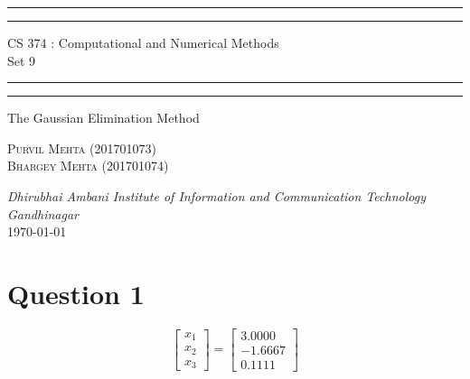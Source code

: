 \documentclass{article}
\begin{document}
\begin{titlepage}
	\centering 
	\scshape
	\vspace*{\baselineskip}
	\rule{\textwidth}{1.6pt}\vspace*{-\baselineskip}\vspace*{2pt}
	\rule{\textwidth}{0.4pt} 
	\vspace{0.75\baselineskip}
	
	{\Large CS 374 : Computational and Numerical Methods \\\vspace{0.75\baselineskip} Set 9}
	\vspace{0.75\baselineskip}
	
	\rule{\textwidth}{0.4pt}\vspace*{-\baselineskip}\vspace{3.2pt} 
	\rule{\textwidth}{1.6pt}
	
	\vspace{2\baselineskip}  
	The Gaussian Elimination Method
	
	\vspace*{3\baselineskip}
	
	\vspace{0.5\baselineskip} %
	
	{\scshape\large Purvil Mehta (201701073) \\ Bhargey Mehta (201701074) \\} 
	
	\vspace{1\baselineskip} 
	
	\textit{Dhirubhai Ambani Institute of Information and Communication Technology \\ Gandhinagar\\} 
	\vspace*{2\baselineskip}
	\today


\end{titlepage}

\newpage

\section*{Question 1}

\begin{Large}
$$
\begin{bmatrix}
x_1 \\
x_2 \\
x_3
\end{bmatrix}
=
\begin{bmatrix}
3.0000 \\
-1.6667\\
0.1111
\end{bmatrix}
$$
\end{Large}
\end{document}
